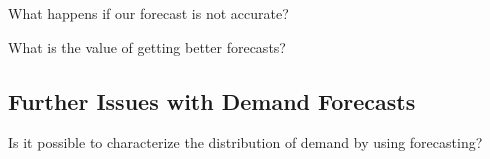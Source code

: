 \begin{exercise}
What happens if our forecast is not accurate?

\end{exercise}

\begin{exercise}
What is the value of getting better forecasts?

\end{exercise}


\subsection{Further Issues with Demand Forecasts}

\begin{exercise}
Is it possible to characterize the distribution of demand by using forecasting?

\end{exercise}

